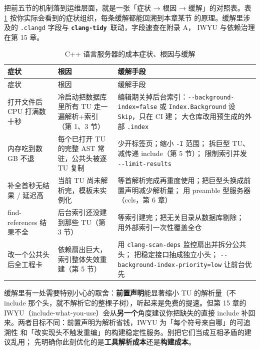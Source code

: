\documentclass[12pt,a4paper,fontset=fandol]{ctexbook}
\newcommand{\Opt}[1]{\texttt{-\/-#1}}
\newcommand{\Bk}{\discretionary{}{}{}}
\newcommand{\Lib}[1]{\textbf{\texttt{#1}}}
\newcommand{\Tidy}{\Lib{clang-tidy}}
\begin{document}
把前五节的机制落到运维层面，就是一张「症状 → 根因 → 缓解」的对照表。表
\ref{tab:ch03-budget} 按你实际会看到的症状组织，每条缓解都能回溯到本章某节
的原理。缓解里涉及的 \texttt{.clangd} 字段与 \Tidy\ 联动，字段速查在附录 A，
IWYU 与依赖治理在第 15 章。

\begin{longtable}{>{\raggedright\arraybackslash}p{}
                  >{\raggedright\arraybackslash}p{}
                  >{\raggedright\arraybackslash}p{}}
\caption{C++ 语言服务器的成本症状、根因与缓解}\label{tab:ch03-budget}\\
\toprule
症状 & 根因 & 缓解手段 \\
\midrule
\endfirsthead
\toprule
症状 & 根因 & 缓解手段 \\
\midrule
\endhead
打开文件后 CPU 打满数十秒 &
  冷启动把数据库里所有 TU 走一遍解析+索引（第 1、3 节） &
  编辑期关掉后台索引：\Opt{background-index=false}\Bk
  或 \texttt{Index.Background} 设 \texttt{Skip}，只在 CI 建；
  大仓库改用预生成的外部 \texttt{.index} \\
\midrule
内存吃到数 GB 不退 &
  每个已打开 TU 的完整 AST 常驻，公共头被逐 TU 复制 &
  少开标签页；缩小 \texttt{-I} 范围；
  拆巨型 TU、减传递 include（第 5 节）；
  限制索引并发 \Opt{limit-results} \\
\midrule
补全首秒无结果 / 延迟高 &
  当前 TU 尚未解析完，模板未实例化 &
  等首解析完成再重度使用；把巨型头换成前置声明减少解析量；
  用 preamble 型服务器（ccls，第 6 章） \\
\midrule
find-references 结果不全 &
  后台索引还没建到那些 TU（第 3 节） &
  等索引建完；把无关目录从数据库剔除；
  用外部索引一次性覆盖全仓 \\
\midrule
改一个公共头后全工程卡 &
  依赖扇出巨大，索引整体失效重建（第 5 节） &
  用 \texttt{clang-\allowbreak scan-\allowbreak deps} 监控扇出并拆分公共头；
  把稳定接口抽成独立小头；
  \Opt{background-\allowbreak index-\allowbreak priority=low} 让前台优先 \\
\bottomrule
\end{longtable}

缓解里有一处需要特别小心的取舍：\textbf{前置声明}能显著缩小 TU 的解析量（不
include 那个头，就不解析它的整棵子树），听起来是免费的提速。但第 15 章的
IWYU（include-what-you-use）会从\textbf{另一个}角度建议你把缺失的直接 include
补回来。两者目标不同：前置声明为解析省钱，IWYU 为「每个符号来自哪」的可追溯性
和「改实现头不触发重编」的构建稳定性服务。别把它们当成互相矛盾的建议乱用；
先明确你此刻优化的是\textbf{工具解析成本}还是\textbf{构建成本}。
\end{document}
